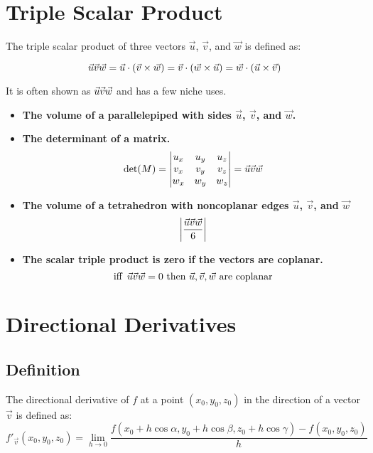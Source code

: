\section{Triple Scalar Product}
The triple scalar product of three vectors \(\vec{u}\), \(\vec{v}\), and \(\vec{w}\) is defined as:

\begin{equation}\label{Triple Scalar Product}
    \vec{u}\vec{v}\vec{w} = 
    \vec{u} \cdot (\vec{v} \times \vec{w}) = \vec{v} \cdot (\vec{w} \times \vec{u}) = \vec{w} \cdot (\vec{u} \times \vec{v})
\end{equation}

It is often shown as $\vec{u}\vec{v}\vec{w}$ and has a few niche uses.
\begin{itemize}
    \item \textbf{The volume of a parallelepiped with sides \(\vec{u}\), \(\vec{v}\), and \(\vec{w}\).}
    \item \textbf{The determinant of a matrix.}
    \[\text{det}(M) = 
    \begin{vmatrix}
        u_x & u_y & u_z \\
        v_x & v_y & v_z \\
        w_x & w_y & w_z \\
    \end{vmatrix}
        = \vec{u}\vec{v}\vec{w}
    \]
    \item \textbf{The volume of a tetrahedron with noncoplanar edges \(\vec{u}\), \(\vec{v}\), and \(\vec{w}\)}
        \[
            \left\vert\dfrac{\vec{u}\vec{v}\vec{w}}{6}\right\vert
        \]
    \item \textbf{The scalar triple product is zero if the vectors are coplanar.} 
        \[
            \text{iff }\, \vec{u}\vec{v}\vec{w} = 0 \text{ then } \vec{u}, \vec{v}, \vec{w} \text{ are coplanar}
        \]
\end{itemize}
\section{Directional Derivatives}
\subsection{Definition}
The directional derivative of \(f\) at a point \((x_0, y_0, z_0)\) in the direction of a vector \(\vec{v}\) is defined as:
\begin{equation}\label{Directional Derivative Definition}
    f'_{\vec{v}}(x_0, y_0, z_0) = 
    \lim_{h \to 0}
    \dfrac{
        f(x_0 + h \cos \alpha, y_0 + h \cos \beta, z_0 + h \cos \gamma) - f(x_0, y_0, z_0)
    }{h}
\end{equation}

